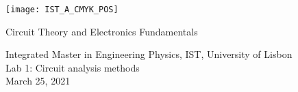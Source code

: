 
\thispagestyle {empty}

\texttt{[image: IST\_A\_CMYK\_POS]}

\begin{center}



\vspace{1.0cm}

\vspace{1cm}
{\FontLb Circuit Theory and Electronics Fundamentals} \\ %
\vspace{1cm}

{\FontSn Integrated Master in Engineering Physics, IST, University of Lisbon} \\
\vspace{1cm}
{\FontSn Lab 1: Circuit analysis methods} \\
\vspace{1cm}
{\FontSn March 25, 2021} \\ %

%
\end{center}

